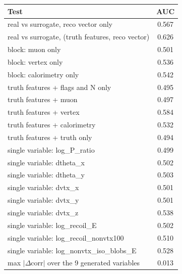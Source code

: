 \begin{tabular}{lc}
\toprule
Test & AUC \\
\midrule
real vs surrogate, reco vector only & 0.567 \\
real vs surrogate, (truth features, reco vector) & 0.626 \\
\midrule
block: muon only & 0.501 \\
block: vertex only & 0.536 \\
block: calorimetry only & 0.542 \\
truth features + flags and N only & 0.495 \\
truth features + muon & 0.497 \\
truth features + vertex & 0.584 \\
truth features + calorimetry & 0.532 \\
truth features + truth only & 0.494 \\
single variable: log\_P\_ratio & 0.499 \\
single variable: dtheta\_x & 0.502 \\
single variable: dtheta\_y & 0.503 \\
single variable: dvtx\_x & 0.501 \\
single variable: dvtx\_y & 0.501 \\
single variable: dvtx\_z & 0.538 \\
single variable: log\_recoil\_E & 0.502 \\
single variable: log\_recoil\_nonvtx100 & 0.510 \\
single variable: log\_nonvtx\_iso\_blobs\_E & 0.528 \\
\midrule
max $|\Delta$corr$|$ over the 9 generated variables & 0.013 \\
\bottomrule
\end{tabular}

